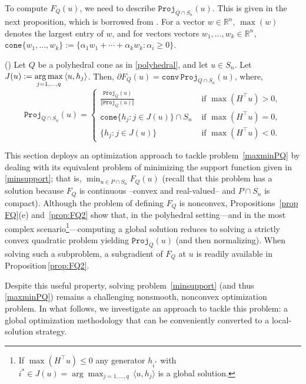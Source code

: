 \documentclass[hidelinks,onefignum,onetabnum]{siamart250211}
\theoremstyle{definition}
\theoremstyle{remark}
\newcommand{\R}{\mathbb R}
\newcommand{\norm}[1]{\textstyle{\Vert} #1 \textstyle{\Vert}}
\newcommand{\proj}{\mathtt{Proj}}
\begin{document}
To compute $F_Q(u)$, we need to describe $\proj_{Q\cap S_n}(u)$. This is given in the next proposition, which is borrowed from \cite[Corollary\,8.6]{Bauschke}. For a vector $w\in\R^n$, $ \max (w)$ denotes the largest entry of $w$, and for vectors vectors $w_1,\ldots,w_k\in\R^n$, $\mathtt{cone}\{w_1,\ldots,w_k\}:=\{\alpha_1 w_1+\cdots+\alpha_k w_k:\alpha_i\geq 0\}.$
\begin{proposition}({\cite[Corollary\,8.6]{Bauschke}})\label{prop:FQ2}
Let $Q$ be a polyhedral cone as in \eqref{polyhedral}, and let $u\in S_n$. Let $J(u):=\mathop{\rm arg\,max}\limits_{j=1,\ldots,q} \,\langle u,h_j\rangle$. Then, $\partial F_Q(u) = \mathtt{conv}\, \proj_{Q\cap S_n}(u)$, where,
\[
\proj_{Q\cap S_n}(u)=
\left\{
\begin{array}{ll}
     \displaystyle \frac{\proj_{Q}(u)}{\norm{\proj_{Q}(u)}}& \mbox{ if } \max( H^\top u) >0,  \\
     \mathtt{cone}\{h_j:j\in J(u)\}\cap S_n& \mbox{ if } \max( H^\top u) =0,  \\
     \{h_j:j\in J(u)\} & \mbox{ if } \max( H^\top u)< 0 .
\end{array}
\right.
\]
\end{proposition}





This section deploys an optimization approach to tackle problem~\eqref{maxminPQ} by dealing with its equivalent problem of minimizing the support function given in \eqref{minsupport}; that is, $\min_{u\in P\cap S_n}F_Q(u)$ (recall that this problem has a solution because $F_Q$ is continuous --convex and real-valued-- and $P\cap S_n$ is compact).
Although the problem of defining $F_Q$ is nonconvex, Propositions~\ref{prop FQ}(e) and~\ref{prop:FQ2} show that, in the polyhedral setting—and in the most complex scenario\footnote{If $\max( H^\top u)\leq 0$ any generator $h_{i^*}$ with $i^*\in J(u)=\arg\max_{j=1,\ldots,q} \, \langle u,h_j\rangle$ is a global solution.}—computing a global solution reduces to solving a strictly convex quadratic problem yielding $\proj_Q(u)$ (and then normalizing). When solving such a subproblem, a subgradient of $F_Q$ at $u$ is readily available in Proposition\,\ref{prop:FQ2}.

Despite this useful property, solving problem~\eqref{minsupport} (and thus \eqref{maxminPQ}) remains a challenging nonsmooth, nonconvex optimization problem. In what follows, we investigate an approach to tackle this problem: a global optimization methodology that can be conveniently converted to a local-solution strategy.
\end{document}
